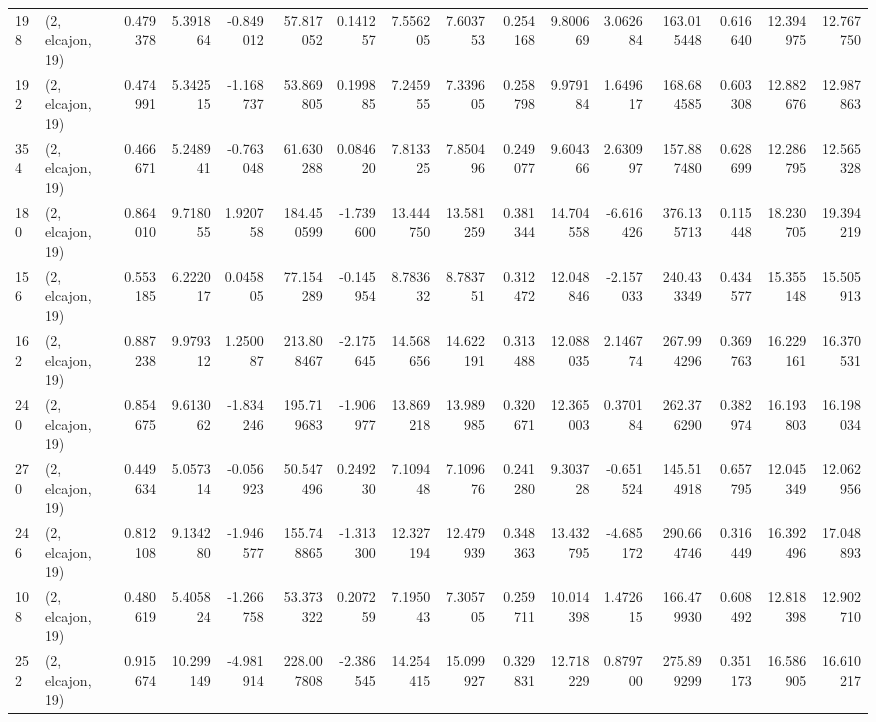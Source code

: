 \begin{tabular}{llrrrrrrrrrrrrrr}
198 &  (2, elcajon, 19) &   0.479378 &   5.391864 &  -0.849012 &    57.817052 &   0.141257 &   7.556205 &   7.603753 &  0.254168 &   9.800669 &   3.062684 &    163.015448 &    0.616640 &   12.394975 &   12.767750 \\
192 &  (2, elcajon, 19) &   0.474991 &   5.342515 &  -1.168737 &    53.869805 &   0.199885 &   7.245955 &   7.339605 &  0.258798 &   9.979184 &   1.649617 &    168.684585 &    0.603308 &   12.882676 &   12.987863 \\
354 &  (2, elcajon, 19) &   0.466671 &   5.248941 &  -0.763048 &    61.630288 &   0.084620 &   7.813325 &   7.850496 &  0.249077 &   9.604366 &   2.630997 &    157.887480 &    0.628699 &   12.286795 &   12.565328 \\
180 &  (2, elcajon, 19) &   0.864010 &   9.718055 &   1.920758 &   184.450599 &  -1.739600 &  13.444750 &  13.581259 &  0.381344 &  14.704558 &  -6.616426 &    376.135713 &    0.115448 &   18.230705 &   19.394219 \\
156 &  (2, elcajon, 19) &   0.553185 &   6.222017 &   0.045805 &    77.154289 &  -0.145954 &   8.783632 &   8.783751 &  0.312472 &  12.048846 &  -2.157033 &    240.433349 &    0.434577 &   15.355148 &   15.505913 \\
162 &  (2, elcajon, 19) &   0.887238 &   9.979312 &   1.250087 &   213.808467 &  -2.175645 &  14.568656 &  14.622191 &  0.313488 &  12.088035 &   2.146774 &    267.994296 &    0.369763 &   16.229161 &   16.370531 \\
240 &  (2, elcajon, 19) &   0.854675 &   9.613062 &  -1.834246 &   195.719683 &  -1.906977 &  13.869218 &  13.989985 &  0.320671 &  12.365003 &   0.370184 &    262.376290 &    0.382974 &   16.193803 &   16.198034 \\
270 &  (2, elcajon, 19) &   0.449634 &   5.057314 &  -0.056923 &    50.547496 &   0.249230 &   7.109448 &   7.109676 &  0.241280 &   9.303728 &  -0.651524 &    145.514918 &    0.657795 &   12.045349 &   12.062956 \\
246 &  (2, elcajon, 19) &   0.812108 &   9.134280 &  -1.946577 &   155.748865 &  -1.313300 &  12.327194 &  12.479939 &  0.348363 &  13.432795 &  -4.685172 &    290.664746 &    0.316449 &   16.392496 &   17.048893 \\
108 &  (2, elcajon, 19) &   0.480619 &   5.405824 &  -1.266758 &    53.373322 &   0.207259 &   7.195043 &   7.305705 &  0.259711 &  10.014398 &   1.472615 &    166.479930 &    0.608492 &   12.818398 &   12.902710 \\
252 &  (2, elcajon, 19) &   0.915674 &  10.299149 &  -4.981914 &   228.007808 &  -2.386545 &  14.254415 &  15.099927 &  0.329831 &  12.718229 &   0.879700 &    275.899299 &    0.351173 &   16.586905 &   16.610217 \\

\end{tabular}
